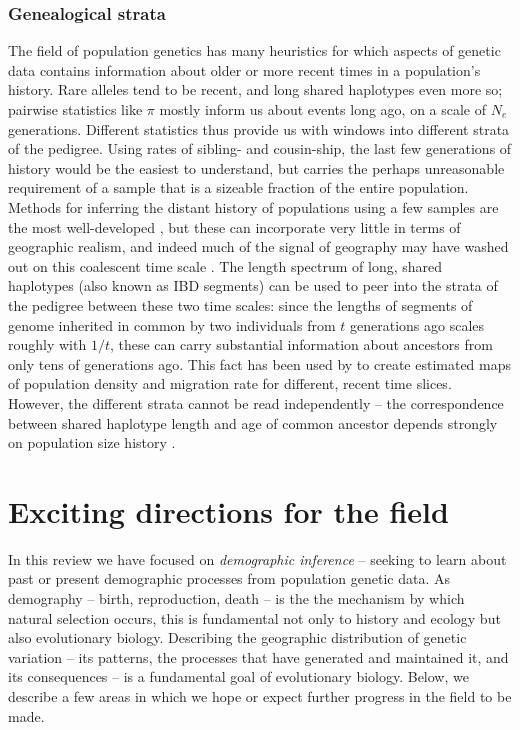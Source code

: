 \documentclass{ar-1col}
\renewcommand{\emph}[1]{{\textit{#1}}}
\begin{document}
\subsubsection{Genealogical strata}

The field of population genetics
has many heuristics for which aspects of genetic data
contains information about older or more recent times in a population's history.
Rare alleles tend to be recent,
and long shared haplotypes even more so;
pairwise statistics like $\pi$ mostly inform us about events long ago,
on a scale of $N_e$ generations.
Different statistics thus provide us with windows into different strata of the pedigree.
Using rates of sibling- and cousin-ship,
the last few generations of history would be the easiest to understand,
but carries the perhaps unreasonable requirement of a sample 
that is a sizeable fraction of the entire population.
Methods for inferring the distant history of populations using a few samples
are the most well-developed \citep[e.g.,]{dadi,Li_Durbin2011,momi},
but these can incorporate very little in terms of geographic realism,
and indeed much of the signal of geography 
may have washed out on this coalescent time scale \citep{wilkins2004separationoftimescales}.
The length spectrum of long, shared haplotypes
(also known as IBD segments)
can be used to peer into the strata of the pedigree between these two time scales:
since the lengths of segments of genome inherited in common by two individuals
from $t$ generations ago scales roughly with $1/t$, 
these can carry substantial information about ancestors from only tens of generations ago.
This fact has been used by \citet{alasadi2018estimating}
to create estimated maps of population density and migration rate
for different, recent time slices.
However, the different strata cannot be read independently
-- the correspondence between shared haplotype length and age of common ancestor
depends strongly on population size history \citep{ralph2013geography}.


\section{Exciting directions for the field}

In this review we have focused on \emph{demographic inference} --
seeking to learn about past or present demographic processes
from population genetic data.
As demography -- birth, reproduction, death -- 
is the the mechanism by which natural selection occurs,
this is fundamental not only to history and ecology but also evolutionary biology.
Describing the geographic distribution of genetic variation -- 
its patterns, 
the processes that have generated and maintained it, 
and its consequences -- 
is a fundamental goal of evolutionary biology.
Below, we describe a few areas 
in which we hope or expect further progress in the field to be made.
\end{document}
